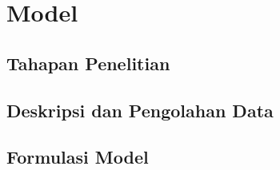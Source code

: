 \chapter{Model}
\label{chap:model}

\section{Tahapan Penelitian}
\label{sec:tahapan_penelitian}

\section{Deskripsi dan Pengolahan Data}
\label{sec:data}

\section{Formulasi Model}
\label{sec:formulasi_model}
